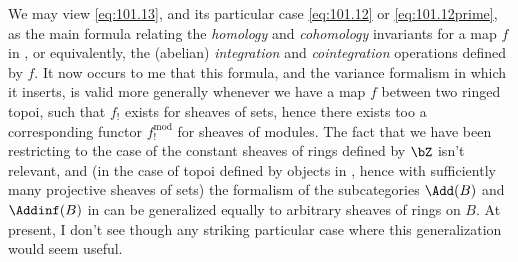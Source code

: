 \begin{remarks}
  We may view \eqref{eq:101.13}, and its particular case
  \eqref{eq:101.12} or \eqref{eq:101.12prime}, as the main formula
  relating the \emph{homology} and \emph{cohomology} invariants for a
  map $f$ in \Cat, or equivalently, the (abelian) \emph{integration}
  and \emph{cointegration} operations defined by $f$. It now occurs to
  me that this formula, and the variance formalism in which it
  inserts, is valid more generally whenever we have a map $f$ between
  two ringed topoi, such that $f_!$ exists for sheaves of sets, hence
  there exists too a corresponding functor $f_!^{\mathrm{mod}}$ for
  sheaves of modules. The fact that we have been restricting to the
  case of the constant sheaves of rings defined by $\bZ$ isn't
  relevant, and (in the case of topoi defined by objects in \Cat,
  hence with sufficiently many projective sheaves of sets) the
  formalism of the subcategories $\Add(B)$ and $\Addinf(B)$ in
  \Bhatab{} can be generalized equally to arbitrary sheaves of rings
  on $B$. At present, I don't see though any striking particular case
  where this generalization would seem useful.
\end{remarks}

